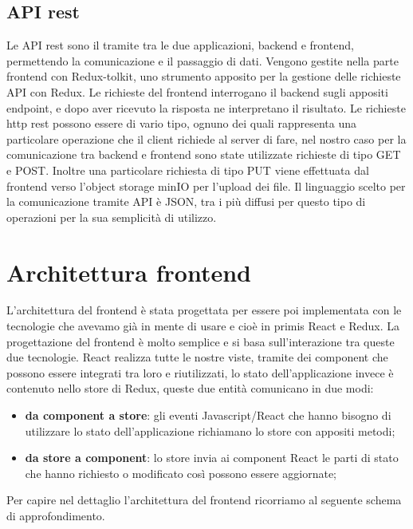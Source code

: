\subsection{API rest}
Le API rest sono il tramite tra le due applicazioni, backend e frontend, permettendo la comunicazione e il passaggio di dati. Vengono gestite nella parte frontend con Redux-tolkit,
uno strumento apposito per la gestione delle richieste API con Redux.
Le richieste del frontend interrogano il backend sugli appositi endpoint, e dopo aver ricevuto la risposta ne interpretano il risultato. Le richieste http rest possono essere di vario tipo,
ognuno dei quali rappresenta una particolare operazione che il client richiede al server di fare, nel nostro caso per la comunicazione tra backend e frontend sono state utilizzate richieste
di tipo GET e POST. Inoltre una particolare richiesta di tipo PUT viene effettuata dal frontend verso l'object storage minIO per l'upload dei file. Il linguaggio scelto per la comunicazione
tramite API è \gls{JSON}\glsfirstoccur, tra i più diffusi per questo tipo di operazioni per la sua semplicità di utilizzo.
\newpage
\section{Architettura frontend}
L'architettura del frontend è stata progettata per essere poi implementata con le tecnologie che avevamo già in mente di usare e cioè in primis React e Redux. La progettazione del
frontend è molto semplice e si basa sull'interazione tra queste due tecnologie. React realizza tutte le nostre viste, tramite dei component che possono essere integrati tra loro
e riutilizzati, lo stato dell'applicazione invece è contenuto nello store di Redux, queste due entità comunicano in due modi:
\begin{itemize}
  \item \textbf{da component a store}: gli eventi Javascript/React che hanno bisogno di utilizzare lo stato dell'applicazione richiamano lo store con appositi metodi;
  \item \textbf{da store a component}: lo store invia ai component React le parti di stato che hanno richiesto o modificato così possono essere aggiornate;
\end{itemize}

Per capire nel dettaglio l'architettura del frontend ricorriamo al seguente schema di approfondimento.

